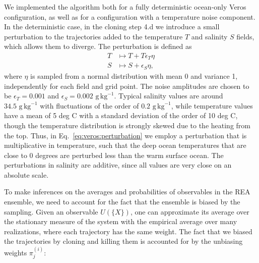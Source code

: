 We implemented the algorithm both for a fully deterministic ocean-only Veros configuration, as well as for a configuration with a temperature noise component. In the deterministic case, in the cloning step 4.d we introduce a small perturbation to the trajectories added to the temperature $T$ and salinity $S$ fields, which allows them to diverge. The perturbation is defined as
\begin{equation}\label{eq:veros:perturbation}
    \begin{aligned}
        T &\mapsto T + T\epsilon_T \eta \\
        S &\mapsto S + \epsilon_S \eta ,
    \end{aligned}
\end{equation}
where $\eta$ is sampled from a normal distribution with mean 0 and variance 1, independently for each field and grid point. The noise amplitudes are chosen to be $\epsilon_T = 0.001$ and $\epsilon_S = 0.002 \,\, \text{g} \, \text{kg}^{-1}$. Typical salinity values are around $34.5 \,\, \text{g} \, \text{kg}^{-1}$ with fluctuations of the order of $0.2 \,\, \text{g} \, \text{kg}^{-1}$, while temperature values have a mean of 5 deg C with a standard deviation of the order of 10 deg C, though the temperature distribution is strongly skewed due to the heating from the top. Thus, in Eq.~\ref{eq:veros:perturbation} we employ a perturbation that is multiplicative in temperature, such that the deep ocean temperatures that are close to 0 degrees are perturbed less than the warm surface ocean. The perturbations in salinity are additive, since all values are very close on an absolute scale. 




To make inferences on the averages and probabilities of observables in the REA ensemble, we need to account for the fact that the ensemble is biased by the sampling. 
Given an observable $U(\{X\})$, one can approximate its average over the stationary measure of the system with the empirical average over many realizations, where each trajectory has the same weight. The fact that we biased the trajectories by cloning and killing them is accounted for by the unbiasing weights $\pi_j^{(i)}$:

